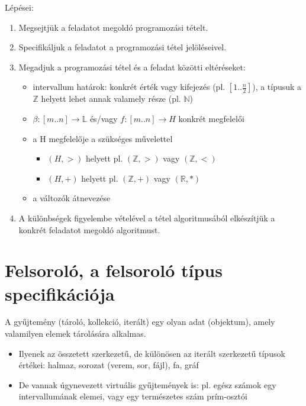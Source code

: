 \documentclass[margin=0px]{article}
\begin{document}
	\noindent Lépései:
	\begin{enumerate}
		\item	Megsejtjük a feladatot megoldó programozási tételt.
		\item	Specifikáljuk a feladatot a programozási tétel jelöléseivel.
		\item	Megadjuk a programozási tétel és a feladat közötti eltéréseket:
			\begin{itemize}
				\item	intervallum határok: konkrét érték vagy kifejezés (pl. $[1..\frac{n}{2}]$),
				a típusuk a $\mathbb{Z}$ helyett lehet annak valamely része (pl. $\mathbb{N}$)
				
				\item	$\beta:[m..n] \to \mathbb{L}$ és/vagy $f:[m..n] \to H$ konkrét megfelelői
				
				\item	a H megfelelője a szükséges művelettel
					\begin{itemize}
						\item	$(H,>)$ helyett pl. $(\mathbb{Z},>)$ vagy $(\mathbb{Z},<)$
						\item	$(H,+)$ helyett pl. $(\mathbb{Z},+)$ vagy $(\mathbb{R},*)$
					\end{itemize}
				\item	a változók átnevezése
			\end{itemize}
		\item	A különbségek figyelembe vételével a tétel algoritmusából elkészítjük a konkrét feladatot megoldó algoritmust.
	\end{enumerate}
	
	\section{Felsoroló, a felsoroló típus specifikációja}
	
	A gyűjtemény (tároló, kollekció, iterált) egy olyan adat
	(objektum), amely valamilyen elemek tárolására alkalmas.
	\begin{itemize}
		\item	Ilyenek az összetett szerkezetű, de különösen az iterált szerkezetű
		típusok értékei: halmaz, sorozat (verem, sor, fájl), fa, gráf

		\item	De vannak úgynevezett virtuális gyűjtemények is: pl. egész számok
		egy intervallumának elemei, vagy egy természetes szám prím-osztói
	\end{itemize}
	
\end{document}
